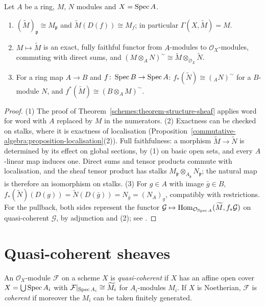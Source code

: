 \begin{proposition}\label{coherent-sheaves:proposition-tilde}
Let $A$ be a ring, $M$, $N$ modules and $X = \operatorname{Spec} A$.
\begin{enumerate}
\item $(\widetilde M)_\mathfrak{p} \cong M_\mathfrak{p}$ and $\widetilde M(D(f)) \cong M_f$; in particular $\Gamma(X, \widetilde M) = M$.
\item $M \mapsto \widetilde M$ is an exact, fully faithful functor from $A$-modules to $\mathcal{O}_X$-modules, commuting with direct sums, and
$(M \otimes_AN)^\sim \cong \widetilde M \otimes_{\mathcal{O}_X}\widetilde N$.
\item For a ring map $A \to B$ and $f \colon \operatorname{Spec} B \to \operatorname{Spec} A$: $f_*(\widetilde N) \cong ({}_AN)^\sim$ for a $B$-module $N$, and
$f^*(\widetilde M) \cong (B \otimes_AM)^\sim$.
\end{enumerate}
\end{proposition}

\begin{proof}
(1) The proof of Theorem~\ref{schemes:theorem-structure-sheaf} applies word for word with $A$ replaced by $M$ in the numerators. (2) Exactness can be
checked on stalks, where it is exactness of localisation (Proposition~\ref{commutative-algebra:proposition-localisation}(2)). Full faithfulness: a
morphism $\widetilde M \to \widetilde N$ is determined by its effect on global sections, by (1) on basic open sets, and every $A$-linear map induces one.
Direct sums and tensor products commute with localisation, and the sheaf tensor product has stalks $M_\mathfrak{p} \otimes_{A_\mathfrak{p}}N_\mathfrak{p}$; the
natural map is therefore an isomorphism on stalks. (3) For $g \in A$ with image $\bar g \in B$,
$f_*(\widetilde N)(D(g)) = \widetilde N(D(\bar g)) = N_{\bar g} = (N_A)_g$, compatibly with restrictions. For the pullback, both sides represent the functor
$\mathcal{G} \mapsto \operatorname{Hom}_{\mathcal{O}_{\operatorname{Spec} A}}(\widetilde M, f_*\mathcal{G})$ on quasi-coherent $\mathcal{G}$, by adjunction and (2); see
\cite[Proposition II.5.2]{hartshorne-ag}.
\end{proof}

\section{Quasi-coherent sheaves}\label{coherent-sheaves:section-quasi-coherent}

\begin{definition}\label{coherent-sheaves:definition-quasi-coherent}
An $\mathcal{O}_X$-module $\mathcal{F}$ on a scheme $X$ is \emph{quasi-coherent} if $X$ has an affine open cover $X = \bigcup\operatorname{Spec} A_i$ with
$\mathcal{F}|_{\operatorname{Spec} A_i} \cong \widetilde{M_i}$ for $A_i$-modules $M_i$. If $X$ is Noetherian, $\mathcal{F}$ is \emph{coherent} if moreover the $M_i$ can be
taken finitely generated.
\end{definition}

